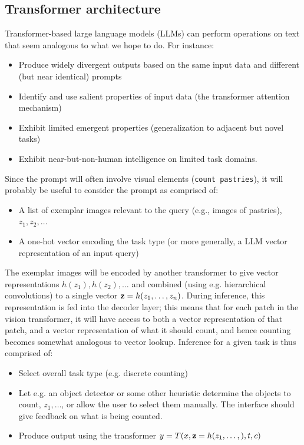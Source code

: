 \documentclass{article}
\begin{document}
\subsection{Transformer architecture}
Transformer-based large language models (LLMs) can perform operations on text that seem analogous to what we hope to do. For instance:
\begin{itemize}
    \item Produce widely divergent outputs based on the same input data and different (but near identical) prompts
    \item Identify and use salient properties of input data (the transformer attention mechanism)
    \item Exhibit limited emergent properties (generalization to adjacent but novel tasks)
    \item Exhibit near-but-non-human intelligence on limited task domains.
\end{itemize}
Since the prompt will often involve visual elements (\texttt{count pastries}), it will probably be useful to consider the prompt as comprised of:
\begin{itemize}
    \item A list of exemplar images relevant to the query (e.g., images of pastries), $z_1,z_2,\dots$
    \item A one-hot vector encoding the task type (or more generally, a LLM vector representation of an input query)    
\end{itemize}
The exemplar images will be encoded by another transformer to give vector representations $h(z_1), h(z_2), \dots$ and combined (using e.g. hierarchical convolutions) to a single vector $\textbf z =h(z_1,\dots,z_n)$. During inference, this representation is fed into the decoder layer; this means that for each patch in the vision transformer, it will have access to both a vector representation of that patch, and a vector representation of what it should count, and hence counting becomes somewhat analogous to vector lookup. Inference for a given task is thus comprised of:
\begin{itemize}
    \item Select overall task type (e.g. discrete counting)
    \item Let e.g. an object detector or some other heuristic determine the objects to count, $z_1,\dots$, or allow the user to select them manually. The interface should give feedback on what is being counted. 
    \item Produce output using the transformer $y = T(x, \textbf z = h(z_1,\dots,), t, c)$
\end{itemize}
\end{document}

